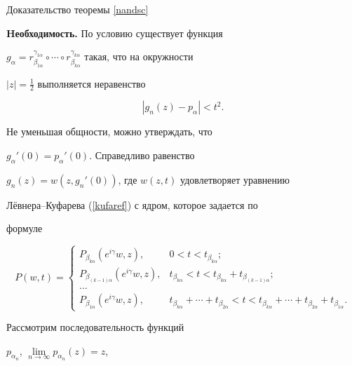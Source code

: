 \begin{pf*}{Доказательство теоремы \ref{nandsc}}


{\bf Hеобходимость.} По условию существует функция


$g_\alpha=r_{\beta_{1\alpha}}^{\gamma_{1\alpha}}\circ\dotsb\circ


r_{\beta_{k\alpha}}^{\gamma_{k\alpha}}$ такая, что на окружности


$|z|=\frac12$ выполняется неравенство


\begin{equation}


\label{estimate} |g_n(z)-p_\alpha|<t^2.


\end{equation}


Не уменьшая общности, можно утверждать, что


$g_\alpha'(0)=p_\alpha'(0)$. Справедливо равенство


$g_n(z)=w(z,g_n'(0))$, где $w(z,t)$ удовлетворяет уравнению


Л\"евнера--Куфарева (\ref{kufaref}) с ядром, которое задается по


формуле


$$


P(w,t)=\begin{cases}


P_{\beta_{k\alpha}}(e^{i\gamma}w,z), &


0<t<t_{\beta_{k\alpha}};\\


P_{\beta_{(k-1)\alpha}}(e^{i\gamma}w,z), &


t_{\beta_{k\alpha}}<t<t_{\beta_{k\alpha}}+t_{\beta_{(k-1)\alpha}};\\


\dotsc\\


P_{\beta_{1\alpha}}(e^{i\gamma}w,z), &


t_{\beta_{k\alpha}}+\dotsb+t_{\beta_{2\alpha}}<


t<t_{\beta_{k\alpha}}+\dotsb+t_{\beta_{2\alpha}}


+t_{\beta_{1\alpha}}.


\end{cases}


$$





Рассмотрим последовательность функций


$p_{\alpha_n}$, $\lim\limits_{n\to\infty}p_{\alpha_n}(z)=z$,



\end{pf*}
